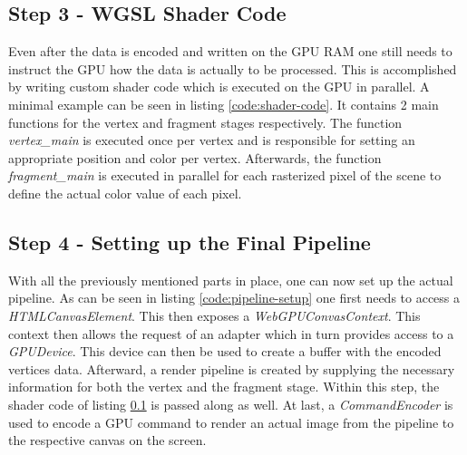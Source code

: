 \begin{samepage}
   { An exemplary
    illustration of how instructions and data of a 3D scene have to be
    handled to use WebGPU.
    }}, language=TypeScript, firstnumber=1, label=code:create-buffer ]
    {listings/helper.ts}
\end{samepage}


\subsection{Step 3 - WGSL Shader Code}
\label{section:shader-code}

Even after the data is encoded and written on the GPU RAM one still
needs to instruct the GPU how the data is actually to be processed. This
is accomplished by writing custom shader code which is executed on the
GPU in parallel. A minimal example can be seen in listing
\ref*{code:shader-code}.  It contains 2 main functions for the vertex
and fragment stages respectively. The function \emph{vertex\_main} is
executed once per vertex and is responsible for setting an appropriate
position and color per vertex. Afterwards, the function
\emph{fragment\_main} is executed in parallel for each rasterized pixel
of the scene to define the actual color value of each pixel. 

\begin{samepage}
   { An exemplary code
    snippet of how to write WGSL Shader Code
    }}, language=WGSL, firstnumber=1, label=code:shader-code ]
    {listings/shader.wgsl}
\end{samepage}


\subsection{Step 4 - Setting up the Final Pipeline}

With all the previously mentioned parts in place, one can now set up the
actual pipeline. As can be seen in listing \ref*{code:pipeline-setup}
one first needs to access a \emph{HTMLCanvasElement}. This then exposes
a \emph{WebGPUConvasContext}. This context then allows the request of an
adapter which in turn provides access to a \emph{GPUDevice}. This device
can then be used to create a buffer with the encoded vertices data.
Afterward, a render pipeline is created by supplying the necessary
information for both the vertex and the fragment stage. Within this
step, the shader code of listing \ref*{section:shader-code} is passed
along as well. At last, a \emph{CommandEncoder} is used to encode a GPU
command to render an actual image from the pipeline to the respective
canvas on the screen. 

